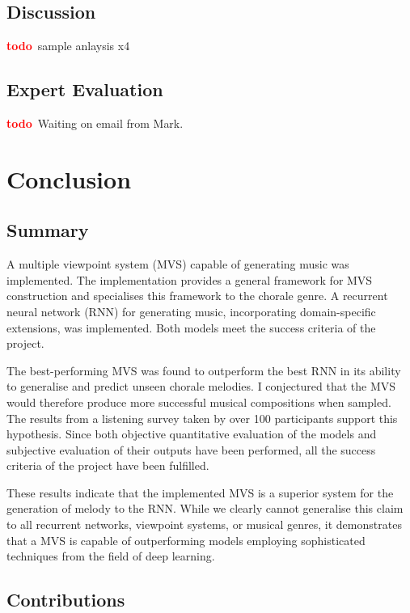 \documentclass[12pt,a4paper,twoside,openright]{report}
\newcommand{\todo}{\textcolor{red}{\textbf{todo}~}}
\begin{document}
\section{Discussion}

\todo sample anlaysis x4

\section{Expert Evaluation}

\todo Waiting on email from Mark.

\chapter{Conclusion}

\section{Summary}

A multiple viewpoint system (MVS) capable of generating music was implemented.
The implementation provides a general framework for MVS construction and
specialises this framework to the chorale genre. A recurrent neural network
(RNN) for generating music, incorporating domain-specific extensions, was
implemented. Both models meet the success criteria of the project.

The best-performing MVS was found to outperform the best RNN in its ability to
generalise and predict unseen chorale melodies. I conjectured that the MVS would
therefore produce more successful musical compositions when sampled. The results
from a listening survey taken by over 100 participants support this hypothesis.
Since both objective quantitative evaluation of the models and subjective
evaluation of their outputs have been performed, all the success criteria of the
project have been fulfilled. 

These results indicate that the implemented MVS is a superior system for the
generation of melody to the RNN. While we clearly cannot generalise this claim
to all recurrent networks, viewpoint systems, or musical genres, it demonstrates
that a MVS is capable of outperforming models employing sophisticated techniques
from the field of deep learning.

\section{Contributions}
\end{document}
